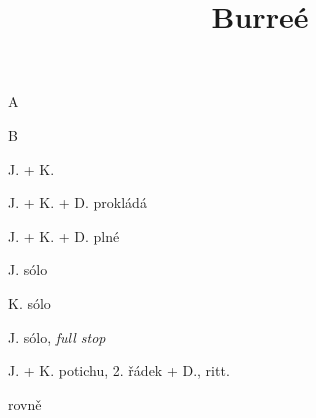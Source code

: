 \documentclass[timestamp]{jazzgrid}
\title{Burreé}
\begin{document}
\maketitle
\begin{musicsection}{A}
\barline
	{\barfour{}
		{}
		{}
		{}
		{}
	}
	{\barfour{}
		{}
		{}
		{}
		{}
	}
	{\barfour{}
		{}
		{}
		{}
		{}
	}
	{\barfour{}
		{}
		{}
		{}
		{}
	}
\barline
	{\barfour{}
		{}
		{}
		{}
		{}
	}
	{\barfour{}
		{}
		{}
		{}
		{}
	}
	{\barfour{}
		{}
		{}
		{}
		{}
	}
	{\barfour{}
		{}
		{}
		{}
		{}
	}
\end{musicsection}

\begin{musicsection}{B}
\barline
	{\barfour{}
		{}
		{}
		{}
		{}
	}
	{\barfour{}
		{}
		{}
		{}
		{}
	}
	{\barfour{}
		{}
		{}
		{}
		{}
	}
	{\barfour{}
		{}
		{}
		{}
		{}
	}
\barline
	{\barfour{}
		{}
		{}
		{}
		{}
	}
	{\barfour{}
		{}
		{}
		{}
		{}
	}
	{\barfour{}
		{}
		{}
		{}
		{}
	}
	{\barfour{}
		{}
		{}
		{}
		{}
	}
\barline
	{\barfour{}
		{}
		{}
		{}
		{}
	}
	{\barfour{}
		{}
		{}
		{}
		{}
	}
	{\barfour{}
		{}
		{}
		{}
		{}
	}
	{\barfour{}
		{}
		{}
		{}
		{}
	}
\barline
	{\barfour{}
		{}
		{}
		{}
		{}
	}
	{\barfour{}
		{}
		{}
		{}
		{}
	}
	{\barfour{}
		{}
		{}
		{}
		{}
	}
	{
		{}
		{}
		{}
		{}
	}
	{
		{}
		{}
		{}
		{}
	}
\end{musicsection}

\begin{multicols*}{2}
\begin{description}[noitemsep,align=right,labelwidth=\widthof{\scriptsize\bfseries{AA}}]
	\scriptsize
	\item [A] J. + K.
	\item [A] J. + K. + D. prokládá
	\item [A] J. + K. + D. plné
	\item [AA] J. sólo
	\item [AA] K. sólo
	\item [AA] J. sólo, \emph{full stop}
	\item [A] J. + K. potichu, 2. řádek + D., ritt.
	\item [BB] rovně
\end{description}
\vfill\null
\columnbreak
\end{multicols*}
\end{document}
